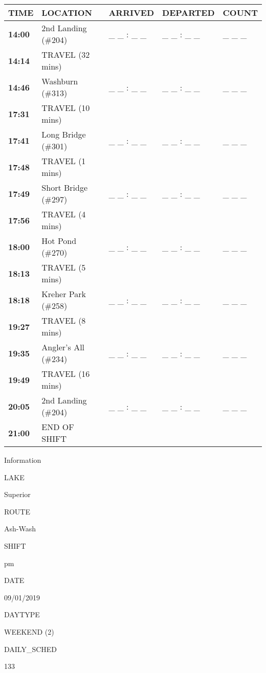 \documentclass[]{article}
\begin{document}
\begin{tabular}{>{\bfseries}lllll}
\toprule
\textbf{TIME} & \textbf{LOCATION} & \textbf{ARRIVED} & \textbf{DEPARTED} & \textbf{COUNT}\\
\midrule
14:00 & 2nd Landing (\#204) & \_ \_ : \_ \_ & \_ \_ : \_ \_ & \_ \_ \_\\
14:14 & TRAVEL (32 mins) &  &  & \\
14:46 & Washburn (\#313) & \_ \_ : \_ \_ & \_ \_ : \_ \_ & \_ \_ \_\\
17:31 & TRAVEL (10 mins) &  &  & \\
17:41 & Long Bridge (\#301) & \_ \_ : \_ \_ & \_ \_ : \_ \_ & \_ \_ \_\\
17:48 & TRAVEL (1 mins) &  &  & \\
17:49 & Short Bridge (\#297) & \_ \_ : \_ \_ & \_ \_ : \_ \_ & \_ \_ \_\\
17:56 & TRAVEL (4 mins) &  &  & \\
18:00 & Hot Pond (\#270) & \_ \_ : \_ \_ & \_ \_ : \_ \_ & \_ \_ \_\\
18:13 & TRAVEL (5 mins) &  &  & \\
18:18 & Kreher Park (\#258) & \_ \_ : \_ \_ & \_ \_ : \_ \_ & \_ \_ \_\\
19:27 & TRAVEL (8 mins) &  &  & \\
19:35 & Angler's All (\#234) & \_ \_ : \_ \_ & \_ \_ : \_ \_ & \_ \_ \_\\
19:49 & TRAVEL (16 mins) &  &  & \\
20:05 & 2nd Landing (\#204) & \_ \_ : \_ \_ & \_ \_ : \_ \_ & \_ \_ \_\\
21:00 & END OF SHIFT &  &  & \\
\bottomrule
\end{tabular}\newpage

Information

LAKE

Superior

ROUTE

Ash-Wash

SHIFT

pm

DATE

09/01/2019

DAYTYPE

WEEKEND (2)

DAILY\_SCHED

133

\vspace{24pt}
\end{document}
